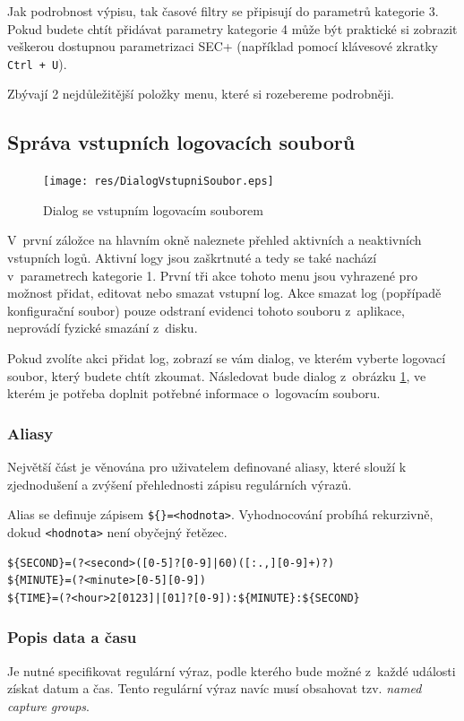 \documentclass[thesis=B,czech]{FITthesis}[2012/06/26]
\begin{document}
Jak podrobnost výpisu, tak časové filtry se připisují do parametrů kategorie 3. Pokud budete chtít přidávat parametry kategorie 4 může být praktické si zobrazit veškerou dostupnou parametrizaci SEC+ (například pomocí klávesové zkratky \texttt{Ctrl + U}).

Zbývají 2 nejdůležitější položky menu, které si rozebereme podrobněji.

\subsection{Správa vstupních logovacích souborů}
\begin{figure}[h]
  \centering
  \texttt{[image: res/DialogVstupniSoubor.eps]}
  \caption{Dialog se vstupním logovacím souborem}
  \label{fig:DialogVstupniSoubor}
\end{figure}

V~první záložce na hlavním okně naleznete přehled aktivních a neaktivních vstupních logů. Aktivní logy jsou zaškrtnuté a tedy se také nachází v~parametrech kategorie 1. První tři akce tohoto menu jsou vyhrazené pro možnost přidat, editovat nebo smazat vstupní log. Akce smazat log (popřípadě konfigurační soubor) pouze odstraní evidenci tohoto souboru z~aplikace, neprovádí fyzické smazání z~disku.

Pokud zvolíte akci přidat log, zobrazí se vám dialog, ve kterém vyberte logovací soubor, který budete chtít zkoumat. Následovat bude dialog z~obrázku \ref{fig:DialogVstupniSoubor}, ve kterém je potřeba doplnit potřebné informace o~logovacím souboru.

\subsubsection{Aliasy}
Největší část je věnována pro uživatelem definované aliasy, které slouží k zjednodušení a zvýšení přehlednosti zápisu regulárních výrazů. 

Alias se definuje zápisem \texttt{\$\{<jmémo proměnné>\}=<hodnota>}. Vyhodnocování probíhá rekurzivně, dokud \texttt{<hodnota>} není obyčejný řetězec.

\begin{lstlisting}[frame=single,caption=Příklad definice tří aliasů, label=aliasExample]
${SECOND}=(?<second>([0-5]?[0-9]|60)([:.,][0-9]+)?)
${MINUTE}=(?<minute>[0-5][0-9])
${TIME}=(?<hour>2[0123]|[01]?[0-9]):${MINUTE}:${SECOND}
\end{lstlisting}

\subsubsection{Popis data a času}
\label{namedCaptureGroups}
Je nutné specifikovat regulární výraz, podle kterého bude možné z~každé události získat datum a čas. Tento regulární výraz navíc musí obsahovat tzv. \textit{named capture groups}. \cite{namedCaptureGroups}
\end{document}
